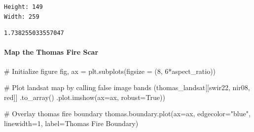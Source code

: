 \documentclass[
  letterpaper,
  DIV=11,
  numbers=noendperiod]{scrartcl}
\let\oldparagraph\paragraph
\renewcommand{\paragraph}[1]{\oldparagraph{#1}\mbox{}}
\newenvironment{Shaded}{\begin{snugshade}}{\end{snugshade}}
\newcommand{\CommentTok}[1]{\textcolor[rgb]{0.37,0.37,0.37}{#1}}
\newcommand{\DecValTok}[1]{\textcolor[rgb]{0.68,0.00,0.00}{#1}}
\newcommand{\NormalTok}[1]{\textcolor[rgb]{0.00,0.23,0.31}{#1}}
\newcommand{\OperatorTok}[1]{\textcolor[rgb]{0.37,0.37,0.37}{#1}}
\newcommand{\StringTok}[1]{\textcolor[rgb]{0.13,0.47,0.30}{#1}}
\newcommand{\VariableTok}[1]{\textcolor[rgb]{0.07,0.07,0.07}{#1}}
\begin{document}
\begin{verbatim}
Height: 149
Width: 259
\end{verbatim}

\begin{verbatim}
1.738255033557047
\end{verbatim}

\hypertarget{map-the-thomas-fire-scar}{%
\paragraph{Map the Thomas Fire Scar}\label{map-the-thomas-fire-scar}}

\begin{Shaded}
\begin{Highlighting}[]
\CommentTok{\# Initialize figure}
\NormalTok{fig, ax }\OperatorTok{=}\NormalTok{ plt.subplots(figsize }\OperatorTok{=}\NormalTok{ (}\DecValTok{8}\NormalTok{, }\DecValTok{6}\OperatorTok{*}\NormalTok{aspect\_ratio))}

\CommentTok{\# Plot landsat map by calling false image bands}
\NormalTok{(thomas\_landsat[[}\StringTok{\textquotesingle{}swir22\textquotesingle{}}\NormalTok{, }\StringTok{\textquotesingle{}nir08\textquotesingle{}}\NormalTok{, }\StringTok{\textquotesingle{}red\textquotesingle{}}\NormalTok{]]}
\NormalTok{ .to\_array()}
\NormalTok{ .plot.imshow(ax}\OperatorTok{=}\NormalTok{ax,}
\NormalTok{              robust}\OperatorTok{=}\VariableTok{True}\NormalTok{))}

\CommentTok{\# Overlay thomas fire boundary }
\NormalTok{thomas.boundary.plot(ax}\OperatorTok{=}\NormalTok{ax,}
\NormalTok{                    edgecolor}\OperatorTok{=}\StringTok{"blue"}\NormalTok{,}
\NormalTok{                    linewidth}\OperatorTok{=}\DecValTok{1}\NormalTok{,}
\NormalTok{                    label}\OperatorTok{=}\StringTok{\textquotesingle{}Thomas Fire Boundary\textquotesingle{}}\NormalTok{)}


\end{Highlighting}
\end{Shaded}
\end{document}
